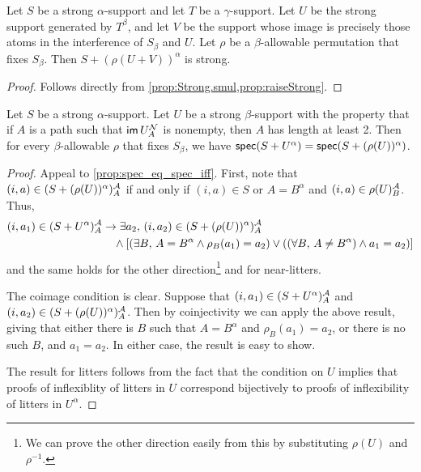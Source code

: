 \begin{proposition}
  \label{prop:raiseRaise_strong}
  Let \( S \) be a strong \( \alpha \)-support and let \( T \) be a \( \gamma \)-support.
  Let \( U \) be the strong support generated by \( T^\beta \), and let \( V \) be the support whose image is precisely those atoms in the interference of \( S_\beta \) and \( U \).
  Let \( \rho \) be a \( \beta \)-allowable permutation that fixes \( S_\beta \).
  Then \( S + (\rho(U + V))^\alpha \) is strong.
\end{proposition}
\begin{proof}
  Follows directly from \cref{prop:Strong.smul,prop:raiseStrong}.
\end{proof}
\begin{proposition}
  \label{prop:combineStrong}
  Let \( S \) be a strong \( \alpha \)-support.
  Let \( U \) be a strong \( \beta \)-support with the property that if \( A \) is a path such that \( \operatorname{\mathsf{im}} U_A^{\mathcal N} \) is nonempty, then \( A \) has length at least 2.
  Then for every \( \beta \)-allowable \( \rho \) that fixes \( S_\beta \), we have \( \operatorname{\mathsf{spec}}(S + U^\alpha) = \operatorname{\mathsf{spec}}(S + (\rho(U))^\alpha) \).
\end{proposition}
\begin{proof}
  Appeal to \cref{prop:spec_eq_spec_iff}.
  First, note that \( (i, a) \in (S + (\rho(U))^\alpha)_A^{\mathcal A} \) if and only if \( (i, a) \in S \) or \( A = B^\alpha \) and \( (i, a) \in \rho(U)_B^{\mathcal A} \).
  Thus,
  \begin{align*}
    (i, a_1) \in (S + U^\alpha)_A^{\mathcal A} &\to \exists a_2,\, (i, a_2) \in (S + (\rho(U))^\alpha)_A^{\mathcal A} \\
    &\quad\wedge [(\exists B,\, A = B^\alpha \wedge \rho_B(a_1) = a_2) \vee ((\forall B,\, A \neq B^\alpha) \wedge a_1 = a_2)]
  \end{align*}
  and the same holds for the other direction\footnote{We can prove the other direction easily from this by substituting \( \rho(U) \) and \( \rho^{-1} \).} and for near-litters.

  The coimage condition is clear.
  Suppose that \( (i, a_1) \in (S + U^\alpha)_A^{\mathcal A} \) and \( (i, a_2) \in (S + (\rho(U))^\alpha)_A^{\mathcal A} \).
  Then by coinjectivity we can apply the above result, giving that either there is \( B \) such that \( A = B^\alpha \) and \( \rho_B(a_1) = a_2 \), or there is no such \( B \), and \( a_1 = a_2 \).
  In either case, the result is easy to show.

  The result for litters follows from the fact that the condition on \( U \) implies that proofs of inflexiblity of litters in \( U \) correspond bijectively to proofs of inflexibility of litters in \( U^\alpha \).
\end{proof}
